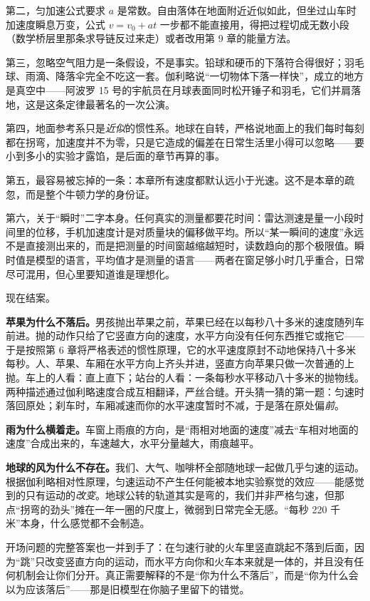 第二，匀加速公式要求 \(a\) 是常数。自由落体在地面附近近似如此，但坐过山车时加速度瞬息万变，公式 \(v=v_0+at\) 一步都不能直接用，得把过程切成无数小段（数学桥层里那条求导链反过来走）或者改用第 9 章的能量方法。

第三，忽略空气阻力是一条假设，不是事实。铅球和硬币的下落符合得很好；羽毛球、雨滴、降落伞完全不吃这一套。伽利略说“一切物体下落一样快”，成立的地方是真空中——阿波罗 15 号的宇航员在月球表面同时松开锤子和羽毛，它们并肩落地，这是这条定律最著名的一次公演。

第四，地面参考系只是\emph{近似}的惯性系。地球在自转，严格说地面上的我们每时每刻都在拐弯，加速度并不为零，只是它造成的偏差在日常生活里小得可以忽略——要小到多小的实验才露馅，是后面的章节再算的事。

第五，最容易被忘掉的一条：本章所有速度都默认远小于光速。这不是本章的疏忽，而是整个牛顿力学的身份证。

第六，关于“瞬时”二字本身。任何真实的测量都要花时间：雷达测速是量一小段时间里的位移，手机加速度计是对质量块的偏移做平均。所以“某一瞬间的速度”永远不是直接测出来的，而是把测量的时间窗越缩越短时，读数趋向的那个极限值。瞬时值是模型的语言，平均值才是测量的语言——两者在窗足够小时几乎重合，日常尽可混用，但心里要知道谁是理想化。


现在结案。

\textbf{苹果为什么不落后。}男孩抛出苹果之前，苹果已经在以每秒八十多米的速度随列车前进。抛的动作只给了它竖直方向的速度，水平方向没有任何东西推它或拖它——于是按照第 6 章将严格表述的惯性原理，它的水平速度原封不动地保持八十多米每秒。人、苹果、车厢在水平方向上齐头并进，竖直方向苹果只做一次普通的上抛。车上的人看：直上直下；站台的人看：一条每秒水平移动八十多米的抛物线。两种描述通过伽利略速度合成互相翻译，严丝合缝。开头猜一猜的第一题：匀速时落回原处；刹车时，车厢减速而你的水平速度暂时不减，于是落在原处偏\emph{前}。

\textbf{雨为什么横着走。}车窗上雨痕的方向，是“雨相对地面的速度”减去“车相对地面的速度”合成出来的，车速越大，水平分量越大，雨痕越平。

\textbf{地球的风为什么不存在。}我们、大气、咖啡杯全部随地球一起做几乎匀速的运动。根据伽利略相对性原理，匀速运动不产生任何能被本地实验察觉的效应——能感觉到的只有运动的\emph{改变}。地球公转的轨道其实是弯的，我们并非严格匀速，但那点“拐弯的劲头”摊在一年一圈的尺度上，微弱到日常完全无感。“每秒 220 千米”本身，什么感觉都不会制造。

开场问题的完整答案也一并到手了：在匀速行驶的火车里竖直跳起不落到后面，因为“跳”只改变竖直方向的运动，而水平方向你和火车本来就是一体的，并且没有任何机制会让你们分开。真正需要解释的不是“你为什么不落后”，而是“你为什么会以为应该落后”——那是旧模型在你脑子里留下的错觉。

